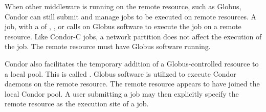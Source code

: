 When other middleware is running on the remote resource,
such as Globus,
Condor can still submit and manage jobs to be executed on
remote resources.
A   job,
with a  of
, , or 
calls on Globus software to execute the job on a remote resource.
Like Condor-C jobs, a network partition does not affect
the execution of the job.
The remote resource must have Globus software running.

Condor also facilitates the temporary addition of a
Globus-controlled resource to a local pool.
This is called .
Globus software is utilized to execute Condor daemons on the
remote resource.
The remote resource appears to have joined the local Condor pool.
A user submitting a job may then explicitly specify the
remote resource as the execution site of a job.

